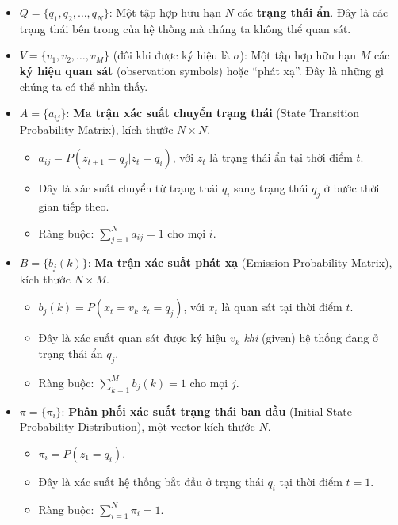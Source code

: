 \documentclass[twoside, final]{hcmut_report}
\begin{document}
\begin{itemize}
    \item $Q = \{q_1, q_2, \ldots, q_N\}$: Một tập hợp hữu hạn $N$ các \textbf{trạng thái ẩn}. Đây là các trạng thái bên trong của hệ thống mà chúng ta không thể quan sát.
    
    \item $V = \{v_1, v_2, \ldots, v_M\}$ (đôi khi được ký hiệu là $\sigma$): Một tập hợp hữu hạn $M$ các \textbf{ký hiệu quan sát} (observation symbols) hoặc ``phát xạ''. Đây là những gì chúng ta có thể nhìn thấy.
    
    \item $A = \{a_{ij}\}$: \textbf{Ma trận xác suất chuyển trạng thái} (State Transition Probability Matrix), kích thước $N \times N$.
    \begin{itemize}
        \item $a_{ij} = P(z_{t+1} = q_j | z_t = q_i)$, với $z_t$ là trạng thái ẩn tại thời điểm $t$.
        \item Đây là xác suất chuyển từ trạng thái $q_i$ sang trạng thái $q_j$ ở bước thời gian tiếp theo.
        \item Ràng buộc: $\sum_{j=1}^{N} a_{ij} = 1$ cho mọi $i$.
    \end{itemize}
    
    \item $B = \{b_j(k)\}$: \textbf{Ma trận xác suất phát xạ} (Emission Probability Matrix), kích thước $N \times M$.
    \begin{itemize}
        \item $b_j(k) = P(x_t = v_k | z_t = q_j)$, với $x_t$ là quan sát tại thời điểm $t$.
        \item Đây là xác suất quan sát được ký hiệu $v_k$ \textit{khi} (given) hệ thống đang ở trạng thái ẩn $q_j$.
        \item Ràng buộc: $\sum_{k=1}^{M} b_j(k) = 1$ cho mọi $j$.
    \end{itemize}
    
    \item $\pi = \{\pi_i\}$: \textbf{Phân phối xác suất trạng thái ban đầu} (Initial State Probability Distribution), một vector kích thước $N$.
    \begin{itemize}
        \item $\pi_i = P(z_1 = q_i)$.
        \item Đây là xác suất hệ thống bắt đầu ở trạng thái $q_i$ tại thời điểm $t = 1$.
        \item Ràng buộc: $\sum_{i=1}^{N} \pi_i = 1$.
    \end{itemize}
\end{itemize}
\end{document}
